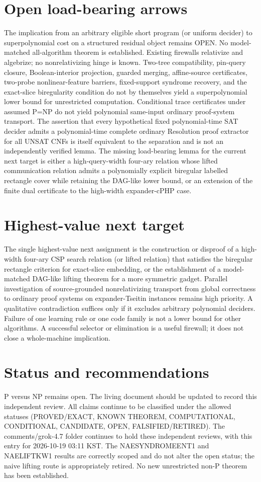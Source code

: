 \documentclass[11pt]{article}
\begin{document}
\section{Open load-bearing arrows}
The implication from an arbitrary eligible short program (or uniform decider) to superpolynomial cost on a structured residual object remains OPEN. No model-matched all-algorithm theorem is established. Existing firewalls relativize and algebrize; no nonrelativizing hinge is known. Two-tree compatibility, pin-query closure, Boolean-interior projection, guarded merging, affine-source certificates, two-probe nonlinear-feature barriers, fixed-support syndrome recovery, and the exact-slice biregularity condition do not by themselves yield a superpolynomial lower bound for unrestricted computation. Conditional trace certificates under assumed P=NP do not yield polynomial same-input ordinary proof-system transport. The assertion that every hypothetical fixed polynomial-time SAT decider admits a polynomial-time complete ordinary Resolution proof extractor for all UNSAT CNFs is itself equivalent to the separation and is not an independently verified lemma. The missing load-bearing lemma for the current next target is either a high-query-width four-ary relation whose lifted communication relation admits a polynomially explicit biregular labelled rectangle cover while retaining the DAG-like lower bound, or an extension of the finite dual certificate to the high-width expander-cPHP case.

\section{Highest-value next target}
The single highest-value next assignment is the construction or disproof of a high-width four-ary CSP search relation (or lifted relation) that satisfies the biregular rectangle criterion for exact-slice embedding, or the establishment of a model-matched DAG-like lifting theorem for a more symmetric gadget. Parallel investigation of source-grounded nonrelativizing transport from global correctness to ordinary proof systems on expander-Tseitin instances remains high priority. A qualitative contradiction suffices only if it excludes arbitrary polynomial deciders. Failure of one learning rule or one code family is not a lower bound for other algorithms. A successful selector or elimination is a useful firewall; it does not close a whole-machine implication.

\section{Status and recommendations}
P versus NP remains open. The living document should be updated to record this independent review. All claims continue to be classified under the allowed statuses (PROVED/EXACT, KNOWN THEOREM, COMPUTATIONAL, CONDITIONAL, CANDIDATE, OPEN, FALSIFIED/RETIRED). The comments/grok-4.7 folder continues to hold these independent reviews, with this entry for 2026-10-19 03:11 KST. The NAESYNDROMEENT1 and NAELIFTKW1 results are correctly scoped and do not alter the open status; the naive lifting route is appropriately retired. No new unrestricted non-P theorem has been established.

\end{document}
